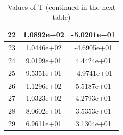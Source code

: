 \documentclass{article}
\begin{document}
\begin{enumerate}
\begin{enumerate}
\begin{table}[h]
\begin{tabular}{|c|c|c|}
\hline                     
22 & 1.0892e+02 & -5.0201e+01 \\
\hline                     
23 & 1.0446e+02 & -4.6905e+01 \\
\hline                     
24 & 9.0199e+01 & 4.4424e+01 \\ 
\hline           
25 & 9.5351e+01 & -4.9741e+01 \\
\hline                     
26 & 1.1296e+02 & 5.5187e+01 \\ 
\hline                     
27 & 1.0323e+02 & 4.2793e+01 \\ 
\hline                     
28 & 8.0602e+01 & 3.5353e+01 \\     
\hline           
29 & 6.9611e+01 & 3.1304e+01 \\ 
\hline                     
\end{tabular}              
\caption{Values of T (continued in the next table)}   
\label{table:MyTableLabel} 
\end{table}   			


\end{enumerate}
\end{enumerate}
\end{document}
